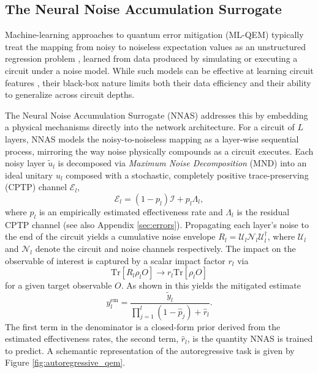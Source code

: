 \subsection{The Neural Noise Accumulation Surrogate}
\label{sec:nnas-background}

Machine-learning approaches to quantum error mitigation (ML-QEM) typically treat the mapping from noisy to noiseless expectation values as an unstructured regression problem \cite{placidi2026deeplearningapproachesquantum}, learned from data produced by simulating or executing a circuit under a noise model. While such models can be effective at learning circuit features \cite{liao_machine_2024}, their black-box nature limits both their data efficiency and their ability to generalize across circuit depths.

The Neural Noise Accumulation Surrogate (NNAS) \cite{xu2025} addresses this by embedding a physical mechanisms directly into the network architecture. For a circuit of $L$ layers, NNAS models the noisy-to-noiseless mapping as a layer-wise sequential process, mirroring the way noise physically compounds as a circuit executes. Each noisy layer $\tilde{u}_l$ is decomposed via \emph{Maximum Noise Decomposition} (MND) into an ideal unitary $u_l$ composed with a stochastic, completely positive trace-preserving (CPTP) channel $\mathcal{E}_l$,
\begin{equation}
    \mathcal{E}_l = (1-p_l)\mathcal{I} + p_l \Lambda_l ,
\end{equation}
where $p_l$ is an empirically estimated effectiveness rate and $\Lambda_l$ is the residual CPTP channel (see also Appendix \ref{sec:errors}).
Propagating each layer's noise to the end of the circuit yields a cumulative noise envelope $R_l = \mathcal{U}_l \mathcal{N}_l \mathcal{U}_l^\dagger$, where $\mathcal{U}_l$ and $\mathcal{N}_l$ denote the circuit and noise channels respectively. The impact on the observable of interest is captured by a scalar impact factor $r_l$ via
\begin{equation}
    \text{Tr}[R_l\rho_l O] \rightarrow r_l\text{Tr}[\rho_l O]
\end{equation}
for a given target observable $O$.
As shown in \cite{xu2025} this yields the mitigated estimate
\begin{equation}
    y_l^{\mathrm{em}} = \frac{\tilde{y}_l}{\prod_{j=1}^{l}(1-\hat{p}_j) + \hat{r}_l} .
    \label{eq:mitigation}
\end{equation}
The first term in the denominator is a closed-form prior derived from the estimated effectiveness rates, the second term, $\hat{r}_l$, is the quantity NNAS is trained to predict. A schemantic representation of the autoregressive task is given by Figure \ref{fig:autoregressive_qem}.

